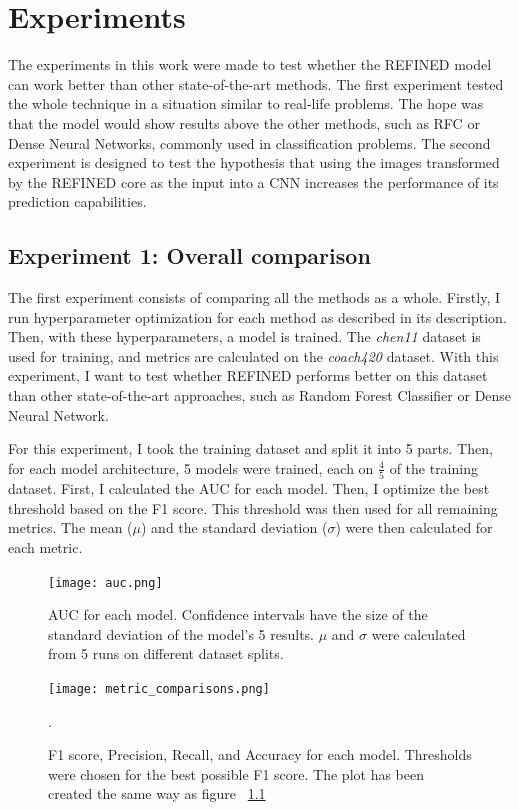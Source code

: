 \chapter{Experiments}
\label{experiments}

The experiments in this work were made to test whether the REFINED model can work better than other state-of-the-art methods. The first experiment tested the whole technique in a situation similar to real-life problems. The hope was that the model would show results above the other methods, such as RFC or Dense Neural Networks, commonly used in classification problems. The second experiment is designed to test the hypothesis that using the images transformed by the REFINED core as the input into a CNN increases the performance of its prediction capabilities.

\section{Experiment 1: Overall comparison}
\label{first_experiment}

The first experiment consists of comparing all the methods as a whole. Firstly, I run hyperparameter optimization for each method as described in its description. Then, with these hyperparameters, a model is trained. The \textit{chen11} dataset is used for training, and metrics are calculated on the \textit{coach420} dataset. With this experiment, I want to test whether REFINED performs better on this dataset than other state-of-the-art approaches, such as Random Forest Classifier or Dense Neural Network.

For this experiment, I took the training dataset and split it into 5 parts. Then, for each model architecture, 5 models were trained, each on $\frac{4}{5}$ of the training dataset. First, I calculated the AUC for each model. Then, I optimize the best threshold based on the F1 score. This threshold was then used for all remaining metrics. The mean ($\mu$) and the standard deviation ($\sigma$) were then calculated for each metric. 
   
\begin{figure}
    \centering
    \texttt{[image: auc.png]}
    \caption{AUC for each model. Confidence intervals have the size of the standard deviation of the model's 5 results. $\mu$ and $\sigma$ were calculated from 5 runs on different dataset splits.}
    \label{fig:auc}
\end{figure}

\begin{figure}
    \centering
    \texttt{[image: metric\_comparisons.png]}
    \caption{F1 score, Precision, Recall, and Accuracy for each model. Thresholds were chosen for the best possible F1 score. The plot has been created the same way as figure ~\ref{fig:auc}}.
    \label{fig:f1_et_al}
\end{figure}

